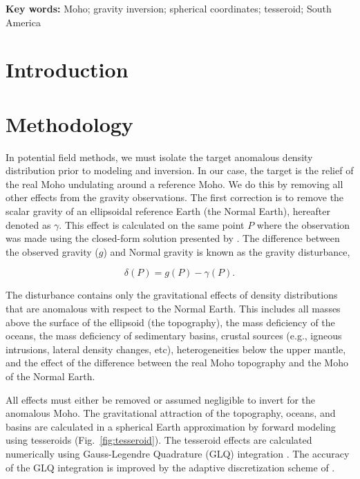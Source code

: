 \documentclass[extra,mreferee]{gji}
\title[]{\Title}
\author[]{
    Leonardo Uieda$^{1,2}$,
    Valéria C. F. Barbosa$^{2}$
    \\
    $^1$Universidade do Estado do Rio de Janeiro, Rio de Janeiro, Brazil.
    e-mail: leouieda@gmail.com
    \\
    $^2$Observatório Nacional, Rio de Janeiro, Brazil.
}
\newcommand{\Keywords}{
        Moho;
        gravity inversion;
        spherical coordinates;
        tesseroid;
        South America
}
\begin{document}
\maketitle


\begin{abstract}
\end{abstract}

\noindent\textbf{Key words:} \Keywords


\section{Introduction}


\section{Methodology}

In potential field methods,
we must isolate the target anomalous density distribution prior to modeling and
inversion.
In our case, the target is the relief of the real Moho undulating around a
reference Moho.
We do this by removing all other effects from the gravity observations.
The first correction is to remove the
scalar gravity of an ellipsoidal reference Earth (the Normal Earth),
hereafter denoted as $\gamma$.
This effect is calculated on the same point $P$ where the observation was made
using the closed-form solution presented by \citet{li2001}.
The difference between the observed gravity ($g$) and Normal gravity
is known as the gravity disturbance,

\begin{equation}
    \delta(P) = g(P) - \gamma(P).
\end{equation}

The disturbance contains only the gravitational effects of density
distributions that are anomalous with respect to the Normal Earth.
This includes all masses above the surface of the ellipsoid (the topography),
the mass deficiency of the oceans,
the mass deficiency of sedimentary basins,
crustal sources (e.g., igneous intrusions, lateral density changes, etc),
heterogeneities below the upper mantle,
and the effect of the difference between the real Moho
topography and the Moho of the Normal Earth.

All effects must either be removed or assumed negligible
to invert for the anomalous Moho.
The gravitational attraction of the topography, oceans, and basins are
calculated in a spherical Earth approximation by forward modeling using
tesseroids
(Fig.~\ref{fig:tesseroid}).
The tesseroid effects are calculated numerically using
Gauss-Legendre Quadrature (GLQ) integration \citep{asgharzadeh2007}.
The accuracy of the GLQ integration is improved by the adaptive discretization
scheme of \citet{uieda2016}.
\end{document}
